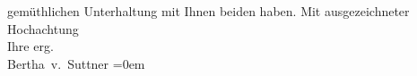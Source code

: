 \begin{ledgroupsized}[t]{13cm}
                    gemüthlichen Unterhaltung mit Ihnen beiden 
                    haben.\pend
           \pstart
           Mit ausgezeichneter Hochachtung{\\[\baselineskip]}Ihre erg.{\\[\baselineskip]}\spacefill\mbox{Bertha v. Suttner}\pend
           \leftskip=0em{}\endnumbering{}\end{ledgroupsized}  \newcommand{\dateiname}{L02153}\newcommand{\titel}{Bertha von Suttner an Arthur Schnitzler, 22. 10. 1913}\newcommand{\editorInnen}{Martin Anton Müller und Gerd-Hermann Susen}
      